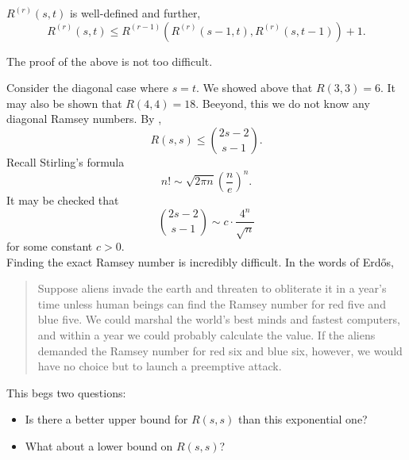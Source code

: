 	\begin{ftheo}
		$R^{(r)}(s,t)$ is well-defined and further,
		\[ R^{(r)}(s,t) \le R^{(r-1)}(R^{(r)}(s-1,t), R^{(r)}(s,t-1)) + 1. \]
	\end{ftheo}
	The proof of the above is not too difficult.

	Consider the diagonal case where $s=t$. We showed above that $R(3,3) = 6$. It may also be shown that $R(4,4) = 18$. Beeyond, this we do not know any diagonal Ramsey numbers. By ,
	\[ R(s,s) \le \binom{2s-2}{s-1}. \]
	Recall Stirling's formula
	\[ n! \sim \sqrt{2\pi n} \left( \frac{n}{e} \right)^n. \]
	It may be checked that
	\[ \binom{2s-2}{s-1} \sim c \cdot \frac{4^n}{\sqrt{n}} \]
	for some constant $c>0$.\\
	Finding the exact Ramsey number is incredibly difficult. In the words of Erd\H{o}s,
	\begin{quote}
		Suppose aliens invade the earth and threaten to obliterate it in a year's time unless human beings can find the Ramsey number for red five and blue five. We could marshal the world's best minds and fastest computers, and within a year we could probably calculate the value. If the aliens demanded the Ramsey number for red six and blue six, however, we would have no choice but to launch a preemptive attack.
	\end{quote}

	This begs two questions:
	\begin{itemize}
	 	\item Is there a better upper bound for $R(s,s)$ than this exponential one? 
	 	\item What about a lower bound on $R(s,s)$?
	 \end{itemize}

